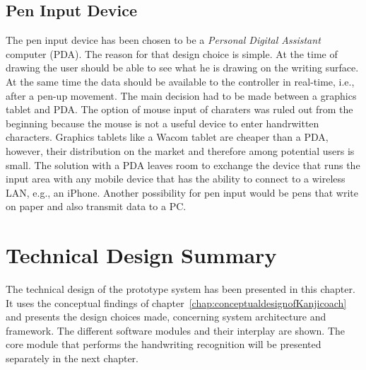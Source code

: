\subsection{Pen Input Device}
\label{sec:peninputdevice}

The pen input device has been chosen to be a \emph{Personal Digital Assistant} 
computer (PDA). The reason for that design choice is simple. At the time of
drawing the user should be able to see what he is drawing on the writing surface.
At the same time the data should be available to the controller in real-time,
i.e., after a pen-up movement.
The main decision had to be made between a graphics tablet and PDA.
The option of mouse input of charaters was ruled out from the beginning
because the mouse is not a useful device to enter handrwitten characters.
Graphics tablets like a Wacom tablet are cheaper than a PDA, however,
their distribution on the market and therefore among potential users is small.
The solution with a PDA leaves room to exchange the device that runs the input
area with any mobile device that has the ability to connect to a wireless LAN,
e.g., an iPhone. Another possibility for pen input would be pens that write on 
paper and also transmit data to a PC. 

\section{Technical Design Summary}
\label{sec:techdesignsummary}

The technical design of the prototype system has been presented in this chapter.
It uses the conceptual findings of 
chapter~\ref{chap:conceptualdesignofKanjicoach} and presents the design
choices made, concerning system architecture and framework.
The different software modules and their interplay are shown.
The core module that performs the handwriting recognition will be presented
separately in the next chapter.
